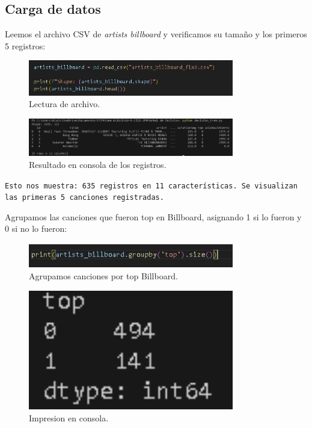 \documentclass[a4paper,12pt]{article}
\begin{document}
\subsection{Carga de datos}
Leemos el archivo CSV de \textit{artists billboard} y verificamos su tamaño y los primeros 5 registros:

\begin{figure}[H]
    \centering
    \includegraphics[width=0.8\textwidth]{2.png}
    \caption{Lectura de archivo.}
    \label{fig:decision_tree}
\end{figure}

\begin{figure}[H]
    \centering
    \includegraphics[width=0.8\textwidth]{3.png}
    \caption{Resultado en consola de los registros.}
    \label{fig:decision_tree}
\end{figure}

\texttt{Esto nos muestra: 635 registros en 11 características. Se visualizan las primeras 5 canciones registradas.}


Agrupamos las canciones que fueron top en Billboard, asignando 1 si lo fueron y 0 si no lo fueron:

\begin{figure}[H]
    \centering
    \includegraphics[width=0.8\textwidth]{4.png}
    \caption{Agrupamos canciones por top Billboard.}
    \label{fig:decision_tree}
\end{figure}

\begin{figure}[H]
    \centering
    \includegraphics[width=0.8\textwidth]{5.png}
    \caption{Impresion en consola.}
    \label{fig:decision_tree}
\end{figure}
\end{document}
